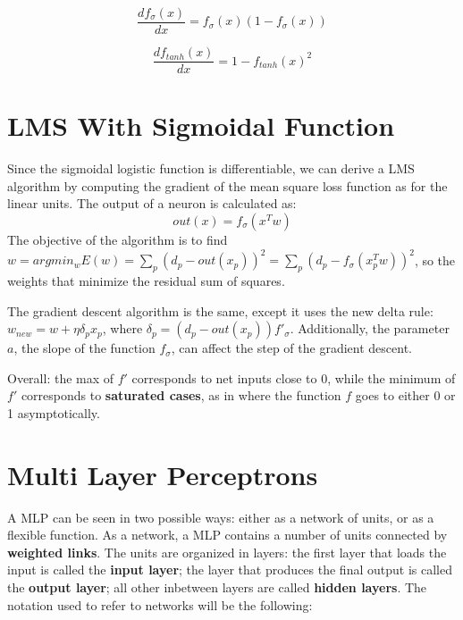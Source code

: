 \begin{equation*}
    \dfrac{df_{\sigma}(x)}{dx} = f_{\sigma}(x)(1-f_{\sigma}(x)) 
\end{equation*}

\begin{equation*}
    \dfrac{df_{tanh}(x)}{dx} = 1 - f_{tanh}(x)^2
\end{equation*}

\section{LMS With Sigmoidal Function}

Since the sigmoidal logistic function is differentiable, we can derive a LMS algorithm by computing the gradient of the mean square loss function as for the linear units. The output of a neuron is calculated as:
\begin{equation*}
    out(x) = f_{\sigma}(x^Tw)
\end{equation*}
The objective of the algorithm is to find $w = argmin_w E(w) = \sum_p (d_p - out(x_p))^2 = \sum_p (d_p - f_{\sigma}(x_p^Tw))^2$, so the weights that minimize the residual sum of squares.

The gradient descent algorithm is the same, except it uses the new delta rule: $w_{new} = w + \eta \delta_p x_p$, where $\delta_p = (d_p - out(x_p))f'_{\sigma}$. Additionally, the parameter $a$, the slope of the function $f_{\sigma}$, can affect the step of the gradient descent.

Overall: the max of $f'$ corresponds to net inputs close to 0, while the minimum of $f'$ corresponds to \textbf{saturated cases}, as in where the function $f$ goes to either 0 or 1 asymptotically.

\section{Multi Layer Perceptrons}

A MLP can be seen in two possible ways: either as a network of units, or as a flexible function. As a network, a MLP contains a number of units connected by \textbf{weighted links}. The units are organized in layers: the first layer that loads the input is called the \textbf{input layer}; the layer that produces the final output is called the \textbf{output layer}; all other inbetween layers are called \textbf{hidden layers}. The notation used to refer to networks will be the following:

